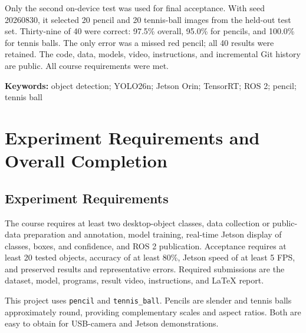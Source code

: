 \documentclass[UTF8,zihao=-4,scheme=chinese,fontset=none]{ctexart}
\begin{document}
Only the second on-device test was used for final acceptance. With seed 20260830, it selected 20 pencil and 20 tennis-ball images from the held-out test set. Thirty-nine of 40 were correct: 97.5\% overall, 95.0\% for pencils, and 100.0\% for tennis balls. The only error was a missed red pencil; all 40 results were retained. The code, data, models, video, instructions, and incremental Git history are public. All course requirements were met.

\noindent\textbf{Keywords:} object detection; YOLO26n; Jetson Orin; TensorRT; ROS 2; pencil; tennis ball
\clearpage\begingroup{}\linespread{1}\selectfont\tableofcontents\endgroup\clearpage
{}\setcounter{page}{1}

\section{Experiment Requirements and Overall Completion}
\subsection{Experiment Requirements}
The course requires at least two desktop-object classes, data collection or public-data preparation and annotation, model training, real-time Jetson display of classes, boxes, and confidence, and ROS 2 publication. Acceptance requires at least 20 tested objects, accuracy of at least 80\%, Jetson speed of at least 5 FPS, and preserved results and representative errors. Required submissions are the dataset, model, programs, result video, instructions, and LaTeX report.

This project uses \texttt{pencil} and \texttt{tennis\_ball}. Pencils are slender and tennis balls approximately round, providing complementary scales and aspect ratios. Both are easy to obtain for USB-camera and Jetson demonstrations.
\end{document}
